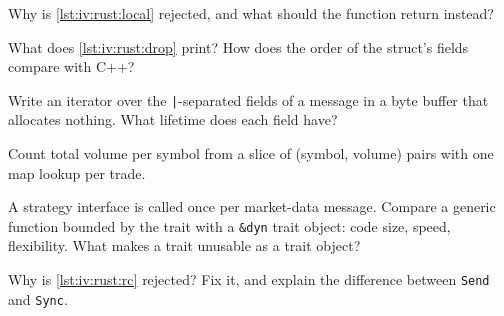 \label{lst:iv:rust:local}

\begin{interviewq}\label{iq:iv:rust:6}
Why is \cref{lst:iv:rust:local} rejected, and what should the function return instead?
\end{interviewq}

\label{lst:iv:rust:drop}

\begin{interviewq}\label{iq:iv:rust:7}
What does \cref{lst:iv:rust:drop} print? How does the order of the struct's fields compare with C++?
\end{interviewq}

\begin{interviewq}\label{iq:iv:rust:8}
Write an iterator over the \texttt{|}-separated fields of a message in a byte buffer that allocates nothing. What lifetime does
each field have?
\end{interviewq}

\begin{interviewq}\label{iq:iv:rust:9}
Count total volume per symbol from a slice of (symbol, volume) pairs with one map lookup per trade.
\end{interviewq}

\begin{interviewq}\label{iq:iv:rust:10}
A strategy interface is called once per market-data message. Compare a generic function bounded by the trait with a
\texttt{\&dyn} trait object: code size, speed, flexibility. What makes a trait unusable as a trait object?
\end{interviewq}

\label{lst:iv:rust:rc}

\begin{interviewq}\label{iq:iv:rust:11}
Why is \cref{lst:iv:rust:rc} rejected? Fix it, and explain the difference between \texttt{Send} and \texttt{Sync}.
\end{interviewq}

